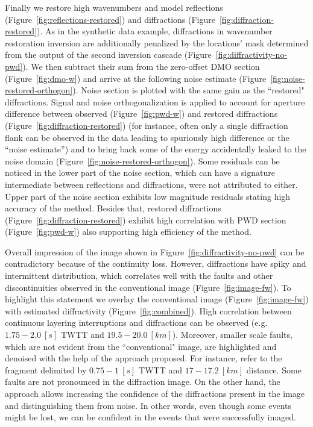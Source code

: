 Finally we restore high wavenumbers and model reflections (Figure~\ref{fig:reflections-restored}) and diffractions (Figure~\ref{fig:diffraction-restored}).
As in the synthetic data example, diffractions in wavenumber restoration inversion are additionally penalized by the locations' mask determined from the output
of the second inversion cascade (Figure~\ref{fig:diffractivity-no-pwd}).
We then subtract their sum from the zero-offset DMO section (Figure~\ref{fig:dmo-w}) and arrive at the following noise estimate (Figure~\ref{fig:noise-restored-orthogon}).
Noise section is plotted with the same gain as the ``restored" diffractions. Signal and noise orthogonalization \cite[]{chen2015random} is applied to account for aperture difference between
observed (Figure~\ref{fig:pwd-w}) and restored diffractions (Figure~\ref{fig:diffraction-restored}) (for instance, often only a single diffraction flank
can be observed in the data leading to spuriously high difference or the ``noise estimate'')
and to bring back some of the energy accidentally leaked to the noise domain (Figure~\ref{fig:noise-restored-orthogon}). Some residuals can be noticed in the lower part of the noise section,
which can have a signature intermediate between reflections and diffractions, were not attributed to either. Upper part
of the noise section exhibits low magnitude residuals stating high accuracy
of the method. Besides that, restored diffractions (Figure~\ref{fig:diffraction-restored})
exhibit high correlation with PWD section (Figure~\ref{fig:pwd-w}) also supporting high efficiency of the method. 


Overall impression of the image shown in Figure~\ref{fig:diffractivity-no-pwd} can be contradictory because of the continuity loss. However,
diffractions have spiky and intermittent distribution, which correlates well with the faults and other discontinuities observed in the conventional image (Figure~\ref{fig:image-fw}).
To highlight this statement we overlay the conventional image (Figure~\ref{fig:image-fw}) with estimated diffractivity (Figure~\ref{fig:combined}).
High correlation between continuous layering interruptions and diffractions can be observed (e.g. $1.75-2.0\ [s]$ TWTT and $19.5-20.0\ [km]$).
Moreover, smaller scale faults, which are not evident from the ``conventional" image, are highlighted and denoised with the help of the approach
proposed. For instance, refer to the fragment delimited by $0.75-1\ [s]$ TWTT and $17-17.2\ [km]$ distance. Some faults are not pronounced
in the diffraction image. On the other hand, the approach allows increasing the confidence of the diffractions present in the image and distinguishing 
them from noise. In other words, even though some events might be lost, we can be confident in the events that were successfully imaged.

